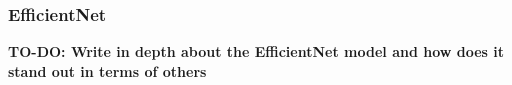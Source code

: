 \subsubsection{EfficientNet}
\textbf{TO-DO: Write in depth about the EfficientNet model and how does it stand out in terms of others}